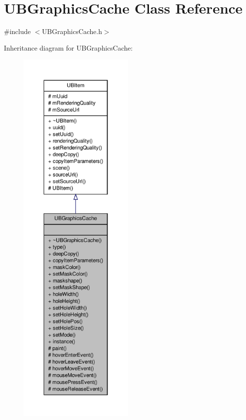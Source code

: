 \hypertarget{class_u_b_graphics_cache}{\section{U\-B\-Graphics\-Cache Class Reference}
\label{d4/d5c/class_u_b_graphics_cache}
}


{\ttfamily \#include $<$U\-B\-Graphics\-Cache.\-h$>$}



Inheritance diagram for U\-B\-Graphics\-Cache\-:
\nopagebreak
\begin{figure}[H]
\begin{center}
\leavevmode
\includegraphics[height=550pt]{dc/d5d/class_u_b_graphics_cache__inherit__graph}
\end{center}
\end{figure}


